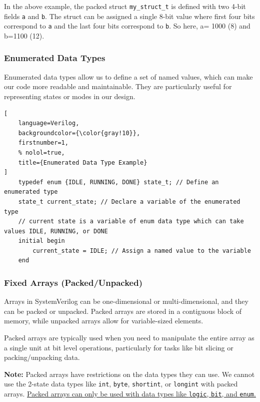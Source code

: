 \documentclass[12pt, a4paper]{article}
\begin{document}
In the above example, the packed struct \texttt{my\_struct\_t} is defined with two 4-bit fields \texttt{a} and \texttt{b}. The struct can be assigned a single 8-bit value where first four bits correspond to \texttt{a} and the last four bits correspond to \texttt{b}. So here, a= 1000 (8) and b=1100 (12).

\vspace{1em}

\subsubsection{Enumerated Data Types}

Enumerated data types allow us to define a set of named values, which can make our code more readable and maintainable. They are particularly useful for representing states or modes in our design.

\begin{lstlisting}[
    language=Verilog,
    backgroundcolor={\color{gray!10}},
    firstnumber=1,
    % nolol=true,
    title={Enumerated Data Type Example}
]
    typedef enum {IDLE, RUNNING, DONE} state_t; // Define an enumerated type
    state_t current_state; // Declare a variable of the enumerated type
    // current state is a variable of enum data type which can take values IDLE, RUNNING, or DONE
    initial begin
        current_state = IDLE; // Assign a named value to the variable
    end
\end{lstlisting}

\subsubsection{Fixed Arrays (Packed/Unpacked)}

Arrays in SystemVerilog can be one-dimensional or multi-dimensional, and they can be packed or unpacked. Packed arrays are stored in a contiguous block of memory, while unpacked arrays allow for variable-sized elements. 

Packed arrays are typically used when you need to manipulate the entire array as a single unit at bit level operations, particularly for tasks like bit slicing or packing/unpacking data.

\textbf{Note:} Packed arrays have restrictions on the data types they can use. We cannot use the 2-state data types like \texttt{int}, \texttt{byte}, \texttt{shortint}, or \texttt{longint} with packed arrays. \ul{Packed arrays can only be used with data types like \texttt{logic}, \texttt{bit}, and \texttt{enum}.}
\end{document}
